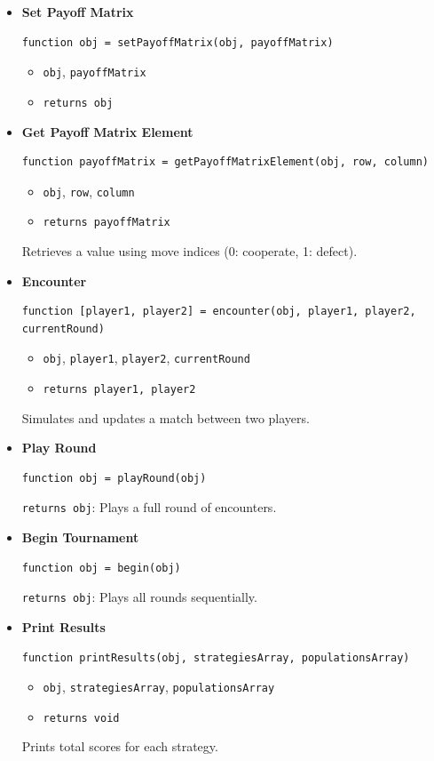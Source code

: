 \documentclass[12pt]{report}
\begin{document}
\begin{itemize}
  \item \textbf{Set Payoff Matrix}
  \begin{verbatim}
function obj = setPayoffMatrix(obj, payoffMatrix)
  \end{verbatim}
  \begin{itemize}
    \item \texttt{obj}, \texttt{payoffMatrix}
    \item \texttt{returns obj}
  \end{itemize}

  \item \textbf{Get Payoff Matrix Element}
  \begin{verbatim}
function payoffMatrix = getPayoffMatrixElement(obj, row, column)
  \end{verbatim}
  \begin{itemize}
    \item \texttt{obj}, \texttt{row}, \texttt{column}
    \item \texttt{returns payoffMatrix}
  \end{itemize}
  Retrieves a value using move indices (0: cooperate, 1: defect).

  \item \textbf{Encounter}
  \begin{verbatim}
function [player1, player2] = encounter(obj, player1, player2, currentRound)
  \end{verbatim}
  \begin{itemize}
    \item \texttt{obj}, \texttt{player1}, \texttt{player2}, \texttt{currentRound}
    \item \texttt{returns player1, player2}
  \end{itemize}
  Simulates and updates a match between two players.

  \item \textbf{Play Round}
  \begin{verbatim}
function obj = playRound(obj)
  \end{verbatim}
  \texttt{returns obj}: Plays a full round of encounters.

  \item \textbf{Begin Tournament}
  \begin{verbatim}
function obj = begin(obj)
  \end{verbatim}
  \texttt{returns obj}: Plays all rounds sequentially.

  \item \textbf{Print Results}
  \begin{verbatim}
function printResults(obj, strategiesArray, populationsArray)
  \end{verbatim}
  \begin{itemize}
    \item \texttt{obj}, \texttt{strategiesArray}, \texttt{populationsArray}
    \item \texttt{returns void}
  \end{itemize}
  Prints total scores for each strategy.

\end{itemize}
\newpage
\end{document}
